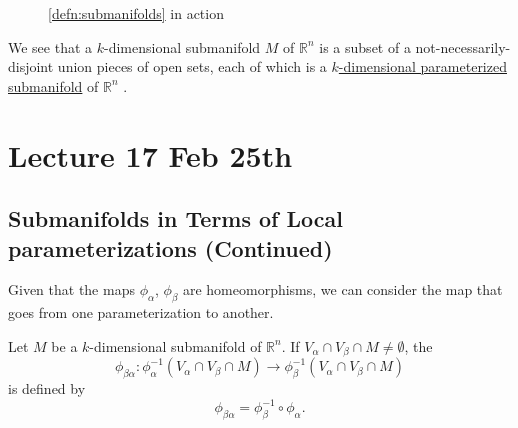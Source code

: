 \documentclass[notoc,notitlepage]{tufte-book}
\begin{document}
\begin{defn}[Submanifolds]
\begin{figure}[ht]
    \caption{\cref{defn:submanifolds} in action}\label{fig:defn_submanifolds}
  \end{figure}
\end{defn}

\begin{note}
  We see that a $k$-dimensional submanifold $M$ of $\mathbb{R}^n$ is a subset of
  a not-necessarily-disjoint union pieces of open sets, each of which is a
  \hyperref[defn:parameterizations_and_parameterized_submanifolds]{$k$-dimensional
  parameterized submanifold} of $\mathbb{R}^n$ .
\end{note}



\chapter{Lecture 17 Feb 25th}%
\label{chp:lecture_17_feb_25th}

\section{Submanifolds in Terms of Local parameterizations (Continued)}%
\label{sec:submanifolds_in_terms_of_local_parameterizations_continued}

Given that the maps $\phi_\alpha$, $\phi_\beta$ are homeomorphisms, we can
consider the map that goes from one parameterization to another.

\begin{defn}\label{defn:transition_map}
  Let $M$ be a $k$-dimensional submanifold of $\mathbb{R}^n$. If $V_\alpha \cap
  V_\beta \cap M \neq \emptyset$, the 
  \begin{equation*}
    \phi_{\beta \alpha} : \phi_{\alpha}^{-1} (V_\alpha \cap V_\beta \cap M) \to
    \phi_{\beta}^{-1} (V_\alpha \cap V_\beta \cap M)
  \end{equation*}
  is defined by
  \begin{equation*}
    \phi_{\beta \alpha} = \phi_{\beta}^{-1} \circ \phi_\alpha.
  \end{equation*}
\end{defn}
\end{document}
